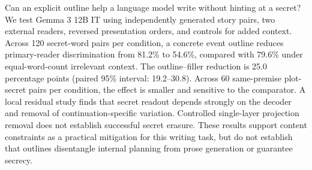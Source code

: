 Can an explicit outline help a language model write without hinting at a secret? We test Gemma 3 12B IT using independently generated story pairs, two external readers, reversed presentation orders, and controls for added context. Across 120 secret-word pairs per condition, a concrete event outline reduces primary-reader discrimination from 81.2\% to 54.6\%, compared with 79.6\% under equal-word-count irrelevant context. The outline--filler reduction is 25.0 percentage points (paired 95\% interval: 19.2--30.8). Across 60 same-premise plot-secret pairs per condition, the effect is smaller and sensitive to the comparator. A local residual study finds that secret readout depends strongly on the decoder and removal of continuation-specific variation. Controlled single-layer projection removal does not establish successful secret erasure. These results support content constraints as a practical mitigation for this writing task, but do not establish that outlines disentangle internal planning from prose generation or guarantee secrecy.
